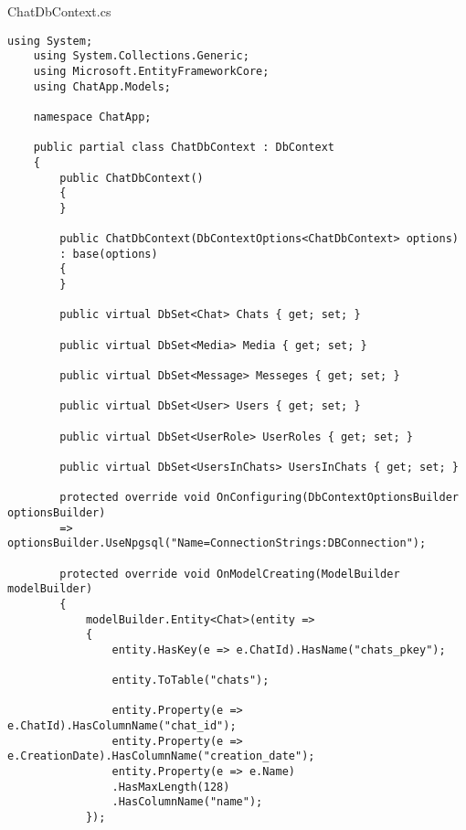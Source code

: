 

ChatDbContext.cs
\begin{lstlisting}[style=c#]
	using System;
	using System.Collections.Generic;
	using Microsoft.EntityFrameworkCore;
	using ChatApp.Models;
	
	namespace ChatApp;
	
	public partial class ChatDbContext : DbContext
	{
		public ChatDbContext()
		{
		}
		
		public ChatDbContext(DbContextOptions<ChatDbContext> options)
		: base(options)
		{
		}
		
		public virtual DbSet<Chat> Chats { get; set; }
		
		public virtual DbSet<Media> Media { get; set; }
		
		public virtual DbSet<Message> Messeges { get; set; }
		
		public virtual DbSet<User> Users { get; set; }
		
		public virtual DbSet<UserRole> UserRoles { get; set; }
		
		public virtual DbSet<UsersInChats> UsersInChats { get; set; }
		
		protected override void OnConfiguring(DbContextOptionsBuilder optionsBuilder)
		=> optionsBuilder.UseNpgsql("Name=ConnectionStrings:DBConnection");
		
		protected override void OnModelCreating(ModelBuilder modelBuilder)
		{
			modelBuilder.Entity<Chat>(entity =>
			{
				entity.HasKey(e => e.ChatId).HasName("chats_pkey");
				
				entity.ToTable("chats");
				
				entity.Property(e => e.ChatId).HasColumnName("chat_id");
				entity.Property(e => e.CreationDate).HasColumnName("creation_date");
				entity.Property(e => e.Name)
				.HasMaxLength(128)
				.HasColumnName("name");
			});
			

\end{lstlisting}
